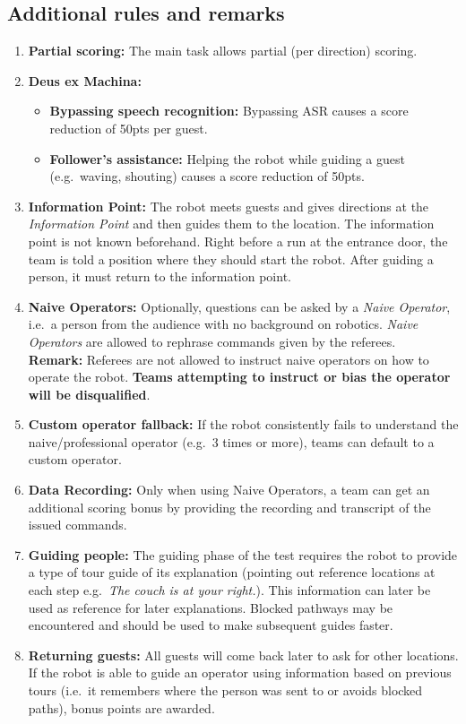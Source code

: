 \subsection*{Additional rules and remarks}
\begin{enumerate}[nosep]
	\item \textbf{Partial scoring:} The main task allows partial (per direction) scoring.
	\item \textbf{Deus ex Machina:}
	\begin{itemize}[nosep]
		\item \textbf{Bypassing speech recognition:} Bypassing ASR causes a score reduction of 50pts per guest.

		\item \textbf{Follower's assistance:} Helping the robot while guiding a guest (e.g.~waving, shouting) causes a score reduction of 50pts.
	\end{itemize}

	\item \textbf{Information Point:} The robot meets guests and gives directions at the \emph{Information Point} and then guides them to the location. The information point is not known beforehand. Right before a run at the entrance door, the team is told a position where they should start the robot.
	After guiding a person, it must return to the information point.

	\item \textbf{Naive Operators:} Optionally, questions can be asked by a \emph{Naive Operator}, i.e.~a person from the audience with no background on robotics. \emph{Naive Operators} are allowed to rephrase commands given by the referees.
	\\\textbf{Remark:} Referees are not allowed to instruct naive operators on how to operate the robot. \textbf{Teams attempting to instruct or bias the operator will be disqualified}.

	\item \textbf{Custom operator fallback:} If the robot consistently fails to understand the naive/professional operator (e.g.~3 times or more), teams can default to a custom operator.
	
	\item \textbf{Data Recording:} Only when using Naive Operators, a team can get an additional scoring bonus by providing the recording and transcript of the issued commands.

	\item \textbf{Guiding people:} The guiding phase of the test requires the robot to provide a type of tour guide of its explanation (pointing out reference locations at each step e.g.~\emph{The couch is at your right.}). This information can later be used as reference for later explanations. Blocked pathways may be encountered and should be used to make subsequent guides faster.

	\item \textbf{Returning guests:} All guests will come back later to ask for other locations.
	If the robot is able to guide an operator using information based on previous tours (i.e.~it remembers where the person was sent to or avoids blocked paths), bonus points are awarded.
\end{enumerate}

